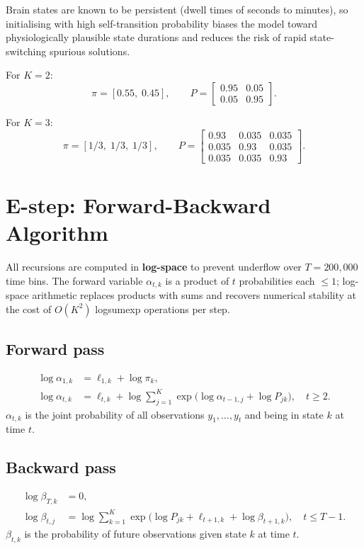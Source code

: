\documentclass[11pt]{article}
\begin{document}
Brain states are known to be persistent (dwell times of seconds to minutes), so
initialising with high self-transition probability biases the model toward
physiologically plausible state durations and reduces the risk of rapid
state-switching spurious solutions.

For $K=2$:
\begin{equation}
  \pi = [0.55,\;0.45],\qquad
  P = \begin{bmatrix}0.95 & 0.05\\0.05 & 0.95\end{bmatrix}.
\end{equation}

For $K=3$:
\begin{equation}
  \pi = [1/3,\;1/3,\;1/3],\qquad
  P = \begin{bmatrix}0.93 & 0.035 & 0.035\\0.035 & 0.93 & 0.035\\0.035 & 0.035 & 0.93\end{bmatrix}.
\end{equation}

\section{E-step: Forward-Backward Algorithm}

All recursions are computed in \textbf{log-space} to prevent underflow over
$T=200{,}000$ time bins.  The forward variable $\alpha_{t,k}$ is a product of $t$
probabilities each $\le 1$; log-space arithmetic replaces products with sums and
recovers numerical stability at the cost of $O(K^2)$ logsumexp operations per step.

\subsection{Forward pass}
\begin{align}
  \log\alpha_{1,k} &= \ell_{1,k} + \log\pi_k,\\
  \log\alpha_{t,k} &= \ell_{t,k}
    + \log\sum_{j=1}^K \exp\!\bigl(\log\alpha_{t-1,j}+\log P_{jk}\bigr),
    \quad t\ge 2.
\end{align}
$\alpha_{t,k}$ is the joint probability of all observations $y_1,\ldots,y_t$ and
being in state $k$ at time $t$.

\subsection{Backward pass}
\begin{align}
  \log\beta_{T,k} &= 0,\\
  \log\beta_{t,j} &= \log\sum_{k=1}^K
    \exp\!\bigl(\log P_{jk}+\ell_{t+1,k}+\log\beta_{t+1,k}\bigr),
    \quad t\le T-1.
\end{align}
$\beta_{t,k}$ is the probability of future observations given state $k$ at time $t$.
\end{document}
